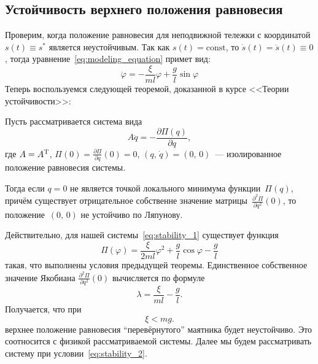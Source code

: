 \subsection{Устойчивость верхнего положения равновесия}

Проверим, когда положение равновесия для неподвижной тележки с координатой $s(t) \equiv s^*$ является неустойчивым.
Так как $s(t) = \mathrm{const}$, то $\dot s(t) = \ddot s(t) \equiv 0$, тогда уравнение~\eqref{eq:modeling_equation} примет вид:
\begin{equation}\label{eq:stability_1}
	\ddot \varphi = - \frac{\xi}{ml}\varphi + \frac{g}{l}\sin\varphi
\end{equation}
Теперь воспользуемся следующей теоремой, доказанной в курсе <<Теории устойчивости>>:
\begin{theorem}[Ляпунов]
	Пусть рассматривается система вида
$$
	A\ddot q = -\frac{\partial\Pi(q)}{\partial q},
$$
	где $A = A^\mathrm{T}$, $\Pi(0) = \frac{\partial\Pi}{\partial q}(0) = 0$, $(q,\,\dot q) = (0,\,0)$~--- изолированное положение равновесия системы.

	Тогда если $q = 0$ не является точкой локального минимума функции~$\Pi(q)$, причём существует отрицательное собственне значение матрицы~$\frac{\partial^2\Pi}{\partial q^2}(0)$, то положение~$(0,\,0)$ не устойчиво по Ляпунову.
\end{theorem}

Действительно, для нашей системы~\eqref{eq:stability_1} существует функция
$$
	\Pi(\varphi) = \frac{\xi}{2ml}\varphi^2 + \frac{g}{l}\cos\varphi - \frac{g}{l}
$$
такая, что выполнены условия предыдущей теоремы. Единственное собственное значение Якобиана $\frac{\partial^2\Pi}{\partial q^2}(0)$ вычисляется по формуле
$$
	\lambda = \frac{\xi}{ml} - \frac{g}{l}.
$$
Получается, что при
\begin{equation}\label{eq:stability_2}
	\xi < mg.
\end{equation}
верхнее положение равновесия ``перевёрнутого'' маятника будет неустойчиво. Это соотносится с физикой рассматриваемой системы. Далее мы будем рассматривать систему при условии~\eqref{eq:stability_2}.